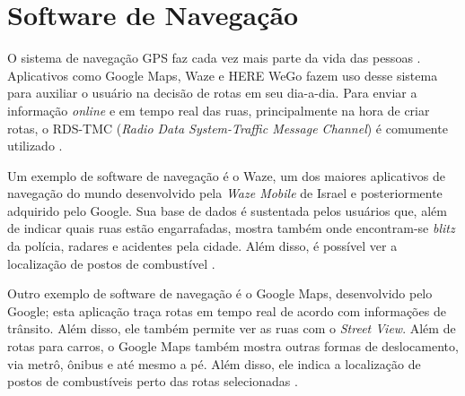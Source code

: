 \section{Software de Navegação}

O sistema de navegação GPS faz cada vez mais parte da vida das pessoas \cite{gps-1}. Aplicativos como Google Maps, Waze e HERE WeGo fazem uso desse sistema para auxiliar o usuário na decisão de rotas em seu dia-a-dia. Para enviar a informação \textit{online} e em tempo real das ruas, principalmente na hora de criar rotas, o RDS-TMC (\textit{Radio Data System-Traffic Message Channel}) é comumente utilizado \cite{rds-tmc}.

Um exemplo de software de navegação é o Waze, um dos maiores aplicativos de navegação do mundo desenvolvido pela \textit{Waze Mobile} de Israel e posteriormente adquirido pelo Google. Sua base de dados é sustentada pelos usuários que, além de indicar quais ruas estão engarrafadas, mostra também onde encontram-se \textit{blitz} da polícia, radares e acidentes pela cidade. Além disso, é possível ver a localização de postos de combustível \cite{waze}.

Outro exemplo de software de navegação é o Google Maps, desenvolvido pelo Google; esta aplicação traça rotas em tempo real de acordo com informações de trânsito. Além disso, ele também permite ver as ruas com o \textit{Street View}. Além de rotas para carros, o Google Maps também mostra outras formas de deslocamento, via metrô, ônibus e até mesmo a pé. Além disso, ele indica a localização de postos de combustíveis perto das rotas selecionadas \cite{google-maps}.
